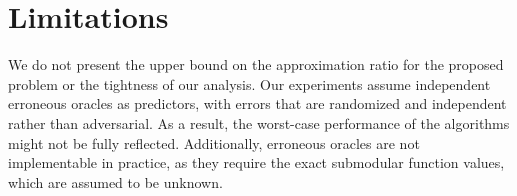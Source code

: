 \section{Limitations} \label{sec:limitations}
We do not present the upper bound on the approximation ratio for the proposed problem or the tightness of our analysis. Our experiments assume independent erroneous oracles as predictors, with errors that are randomized and independent rather than adversarial. As a result, the worst-case performance of the algorithms might not be fully reflected. Additionally, erroneous oracles are not implementable in practice, as they require the exact submodular function values, which are assumed to be unknown. 
